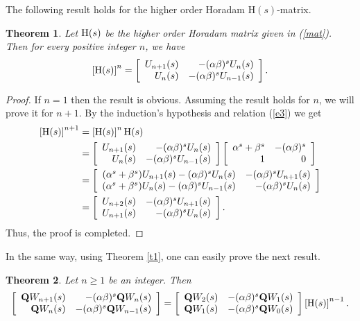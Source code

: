 \documentclass{kms-c}
\theoremstyle{plain}
\newtheorem{theorem}{Theorem}[section]
\theoremstyle{definition}
\theoremstyle{remark}
\begin{document}
The following result holds for the higher order Horadam $\textrm{H}(s)$-matrix.
\begin{theorem}\label{t9}
Let $\textnormal{\textrm{H}}(s)$ be the higher order Horadam matrix given in (\ref{mat}). Then for every positive integer $n$, we have
\[
\left[\textnormal{\textrm{H}}(s)\right]^{n}=\left[\begin{array}{rr} U_{n+1}(s)& -(\alpha\beta)^{s}U_{n}(s)\\
U_{n}(s)&-(\alpha\beta)^{s}U_{n-1}(s)\end{array}\right].
\]
\end{theorem}
\begin{proof}
If $n=1$ then the result is obvious. Assuming the result holds for $n$, we will prove it for $n+1$. By the induction's hypothesis and relation (\ref{e3}) we get
\begin{align*}
\left[\textnormal{\textrm{H}}(s)\right]^{n+1}&=\left[\textnormal{\textrm{H}}(s)\right]^{n}\textnormal{\textrm{H}}(s)\\
&=\left[\begin{array}{rr} U_{n+1}(s)& -(\alpha\beta)^{s}U_{n}(s)\\
U_{n}(s)&-(\alpha\beta)^{s}U_{n-1}(s)\end{array}\right]\left[\begin{array}{rr} \alpha^{s}+\beta^{s}& -(\alpha\beta)^{s}\\
1&0\end{array}\right]\\
&=\left[\begin{array}{rr} (\alpha^{s}+\beta^{s})U_{n+1}(s)-(\alpha\beta)^{s}U_{n}(s)& -(\alpha\beta)^{s}U_{n+1}(s)\\
(\alpha^{s}+\beta^{s})U_{n}(s)-(\alpha\beta)^{s}U_{n-1}(s)&-(\alpha\beta)^{s}U_{n}(s)\end{array}\right]\\
&=\left[\begin{array}{rr} U_{n+2}(s)& -(\alpha\beta)^{s}U_{n+1}(s)\\
U_{n+1}(s)&-(\alpha\beta)^{s}U_{n}(s)\end{array}\right].
\end{align*}
Thus, the proof is completed.
\end{proof}

In the same way, using Theorem \ref{t1}, one can easily prove the next result.
\begin{theorem}\label{t10}
Let $n\geq 1$ be an integer. Then
\[
\left[\begin{array}{rr} \textnormal{\textbf{Q}}W_{n+1}(s)& -(\alpha\beta)^{s}\textnormal{\textbf{Q}}W_{n}(s)\\
\textnormal{\textbf{Q}}W_{n}(s)&-(\alpha\beta)^{s}\textnormal{\textbf{Q}}W_{n-1}(s)\end{array}\right]=\left[\begin{array}{rr} \textnormal{\textbf{Q}}W_{2}(s)& -(\alpha\beta)^{s}\textnormal{\textbf{Q}}W_{1}(s)\\
\textnormal{\textbf{Q}}W_{1}(s)&-(\alpha\beta)^{s}\textnormal{\textbf{Q}}W_{0}(s)\end{array}\right]\left[\textnormal{\textrm{H}}(s)\right]^{n-1}.
\]
\end{theorem}
\end{document}
